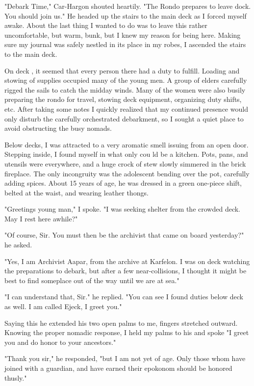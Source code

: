 \begin{multicols*}{2}
"Debark Time," Car-Hargon shouted heartily. "The Rondo prepares to leave dock. You should join us." He headed up the stairs to the main deck as I forced myself
awake. About the last thing I wanted to do was to leave this rather uncomfortable, but warm, bunk, but I knew my reason for being here. Making sure my journal was safely nestled in its place in my robes, I ascended the stairs to the main deck.

On deck , it seemed that every person there had a duty to fulfill. Loading and stowing of supplies occupied many of the young men. A group of elders carefully rigged the sails to catch the midday winds. Many of the women were also busily preparing the rondo for travel, stowing deck equipment, organizing duty shifts, etc. After taking some notes I quickly realized that my continued presence would only disturb the carefully orchestrated debarkment, so I sought a quiet place to avoid obstructing the busy nomads.

Below decks, I was attracted to a very aromatic smell issuing from an open door. Stepping inside, I found myself in what only cou ld be a kitchen. Pots, pans, and utensils were everywhere, and a huge crock of stew slowly simmered in the brick fireplace. The only incongruity was the adolescent bending over the pot, carefully adding spices. About 15 years of age, he was dressed in a green one-piece shift, belted at the waist, and wearing leather thongs.

"Greetings young man," I spoke. "I was seeking shelter from the crowded deck. May I rest here awhile?"

"Of course, Sir. You must then be the archivist that came on board yesterday?" he asked.

"Yes, I am Archivist Aapar, from the archive at Karfelon. I was on deck watching the preparations to debark, but after a few near-collisions, I thought it might be best to find someplace out of the way until we are at sea."

"I can understand that, Sir." he replied. "You can see I found duties below deck as well. I am called Ejeck, I greet you."

Saying this he extended his two open palms to me, fingers stretched outward. Knowing the proper nomadic response, I held my palms to his and spoke "I greet you and
do honor to your ancestors."

"Thank you sir," he responded, "but I am not yet of age. Only those whom have joined with a guardian, and have earned their epokonom should be honored thusly."


\end{multicols*}
